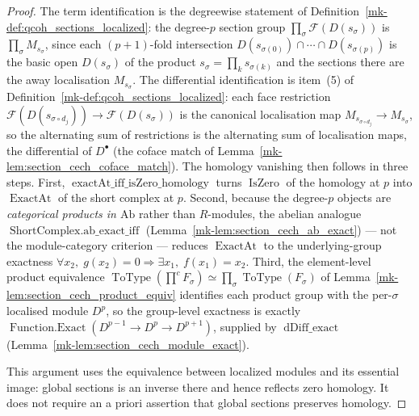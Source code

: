 \begin{proof}
  The term identification is the degreewise statement of
  Definition~\ref{mk-def:qcoh_sections_localized}: the degree-\(p\) section group
  \(\prod_\sigma \mathcal{F}(D(s_\sigma))\) is \(\prod_\sigma M_{s_\sigma}\), since
  each \((p+1)\)-fold intersection \(D(s_{\sigma(0)}) \cap \cdots \cap
  D(s_{\sigma(p)})\) is the basic open \(D(s_\sigma)\) of the product
  \(s_\sigma = \prod_k s_{\sigma(k)}\) and the sections there are the away
  localisation \(M_{s_\sigma}\). The differential identification is item~(5) of
  Definition~\ref{mk-def:qcoh_sections_localized}: each face restriction
  \(\mathcal{F}(D(s_{\sigma \circ d_j})) \to \mathcal{F}(D(s_\sigma))\) is the
  canonical localisation map \(M_{s_{\sigma \circ d_j}} \to M_{s_\sigma}\), so the
  alternating sum of restrictions is the alternating sum of localisation maps, the
  differential of \(D^\bullet\) (the coface match of
  Lemma~\ref{mk-lem:section_cech_coface_match}). The homology vanishing then follows in
  three steps. First, \(\operatorname{exactAt\_iff\_isZero\_homology}\) turns
  \(\operatorname{IsZero}\) of the homology at \(p\) into \(\operatorname{ExactAt}\) of
  the short complex at \(p\). Second, because the degree-\(p\) objects are
  \emph{categorical products in \(\mathrm{Ab}\)} rather than \(R\)-modules, the abelian
  analogue \(\operatorname{ShortComplex.ab\_exact\_iff}\)
  (Lemma~\ref{mk-lem:section_cech_ab_exact}) --- not the module-category criterion ---
  reduces \(\operatorname{ExactAt}\) to the underlying-group exactness
  \(\forall x_2,\; g(x_2) = 0 \Rightarrow \exists x_1,\; f(x_1) = x_2\). Third, the
  element-level product equivalence
  \(\operatorname{ToType}(\prod^{c} F_\sigma) \simeq \prod_\sigma
  \operatorname{ToType}(F_\sigma)\) of Lemma~\ref{mk-lem:section_cech_product_equiv}
  identifies each product group with the per-\(\sigma\) localised module \(D^p\), so the
  group-level exactness is exactly \(\operatorname{Function.Exact}(D^{p-1} \to D^p \to
  D^{p+1})\), supplied by \(\operatorname{dDiff\_exact}\)
  (Lemma~\ref{mk-lem:section_cech_module_exact}).

  This argument uses the equivalence between localized modules and its essential
  image: global sections is an inverse there and hence reflects zero homology. It does
  not require an a priori assertion that global sections preserves homology.
\end{proof}

